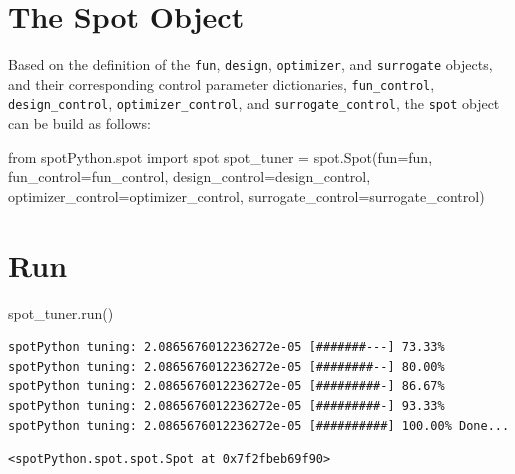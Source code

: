 \documentclass[
  letterpaper,
  DIV=11,
  numbers=noendperiod]{scrreprt}
\newenvironment{Shaded}{\begin{snugshade}}{\end{snugshade}}
\newcommand{\ImportTok}[1]{\textcolor[rgb]{0.00,0.46,0.62}{#1}}
\newcommand{\NormalTok}[1]{\textcolor[rgb]{0.00,0.23,0.31}{#1}}
\newcommand{\OperatorTok}[1]{\textcolor[rgb]{0.37,0.37,0.37}{#1}}
\begin{document}
\section{The Spot Object}\label{the-spot-object}

Based on the definition of the \texttt{fun}, \texttt{design},
\texttt{optimizer}, and \texttt{surrogate} objects, and their
corresponding control parameter dictionaries, \texttt{fun\_control},
\texttt{design\_control}, \texttt{optimizer\_control}, and
\texttt{surrogate\_control}, the \texttt{spot} object can be build as
follows:

\begin{Shaded}
\begin{Highlighting}[]
\ImportTok{from}\NormalTok{ spotPython.spot }\ImportTok{import}\NormalTok{ spot}
\NormalTok{spot\_tuner }\OperatorTok{=}\NormalTok{ spot.Spot(fun}\OperatorTok{=}\NormalTok{fun,}
\NormalTok{                       fun\_control}\OperatorTok{=}\NormalTok{fun\_control,}
\NormalTok{                       design\_control}\OperatorTok{=}\NormalTok{design\_control,}
\NormalTok{                       optimizer\_control}\OperatorTok{=}\NormalTok{optimizer\_control,}
\NormalTok{                       surrogate\_control}\OperatorTok{=}\NormalTok{surrogate\_control)}
\end{Highlighting}
\end{Shaded}

\section{Run}\label{run}

\begin{Shaded}
\begin{Highlighting}[]
\NormalTok{spot\_tuner.run()}
\end{Highlighting}
\end{Shaded}

\begin{verbatim}
spotPython tuning: 2.0865676012236272e-05 [#######---] 73.33% 
spotPython tuning: 2.0865676012236272e-05 [########--] 80.00% 
spotPython tuning: 2.0865676012236272e-05 [#########-] 86.67% 
spotPython tuning: 2.0865676012236272e-05 [#########-] 93.33% 
spotPython tuning: 2.0865676012236272e-05 [##########] 100.00% Done...
\end{verbatim}

\begin{verbatim}
<spotPython.spot.spot.Spot at 0x7f2fbeb69f90>
\end{verbatim}
\end{document}
